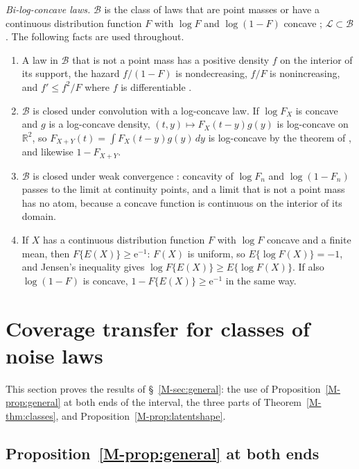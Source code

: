 \documentclass[11pt]{article}
\renewcommand{\_}{\usc\allowbreak}
\newcommand{\LC}{\mathcal{L}}
\begin{document}
\emph{Bi-log-concave laws.} $\mathcal B$ is the class of laws that are point masses or have a continuous distribution function $F$ with $\log F$ and $\log(1-F)$ concave \citep{dumbgen2017}; $\LC \subset \mathcal B$. The following facts are used throughout.
\begin{enumerate}
\item A law in $\mathcal B$ that is not a point mass has a positive density $f$ on the interior of its support, the hazard $f/(1 - F)$ is nondecreasing, $f/F$ is nonincreasing, and $f' \le f^2/F$ where $f$ is differentiable \citep{dumbgen2017}.
\item $\mathcal B$ is closed under convolution with a log-concave law. If $\log F_X$ is concave and $g$ is a log-concave density, $(t, y) \mapsto F_X(t - y)g(y)$ is log-concave on $\mathbb R^2$, so $F_{X+Y}(t) = \int F_X(t-y)g(y)\,dy$ is log-concave by the theorem of \citet{prekopa1973}, and likewise $1 - F_{X+Y}$.
\item $\mathcal B$ is closed under weak convergence \citep{saumard2019}: concavity of $\log F_n$ and $\log(1-F_n)$ passes to the limit at continuity points, and a limit that is not a point mass has no atom, because a concave function is continuous on the interior of its domain.
\item If $X$ has a continuous distribution function $F$ with $\log F$ concave and a finite mean, then $F\{E(X)\} \ge \mathrm{e}^{-1}$: $F(X)$ is uniform, so $E\{\log F(X)\} = -1$, and Jensen's inequality gives $\log F\{E(X)\} \ge E\{\log F(X)\}$. If also $\log(1 - F)$ is concave, $1 - F\{E(X)\} \ge \mathrm{e}^{-1}$ in the same way.
\end{enumerate}

\section{Coverage transfer for classes of noise laws}\label{sec:s-general}

This section proves the results of \S~\ref{M-sec:general}: the use of Proposition~\ref{M-prop:general} at both ends of the interval, the three parts of Theorem~\ref{M-thm:classes}, and Proposition~\ref{M-prop:latentshape}.

\subsection*{Proposition~\ref{M-prop:general} at both ends}
\end{document}
